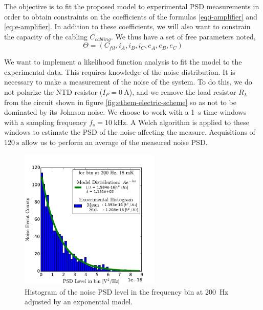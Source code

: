 The objective is to fit the proposed model to experimental PSD measurements in order to obtain constraints on the coefficients of the formulas \ref{eq:i-amplifier} and \ref{eq:e-amplifier}. In addition to these coefficients, we will also want to constrain the capacity of the cabling $C_{cabling}$. We thus have a set of free parameters noted,
\begin{equation}
\Theta=(C_{fil}, i_A, i_B, i_C, e_A, e_B, e_C)
\end{equation}

We want to implement a likelihood function analysis to fit the model to the experimental data. This requires knowledge of the noise distribution. It is necessary to make a measurement of the noise of the system. To do this, we do not polarize the NTD resistor ($I_P=\SI{0}{\ampere}$), and we remove the load resistor $R_L$ from the circuit shown in figure \ref{fig:ethem-electric-scheme} so as not to be dominated by its Johnson noise. We choose to work with a \SI{1}{\s} time windows with a sampling frequency $f_s=\SI{10}{\kilo\Hz}$. A Welch algorithm is applied to these windows to estimate the PSD of the noise affecting the measure. Acquisitions of $\SI{120}{\s}$ allow us to perform an average of the measured noise PSD.

\begin{figure}
\begin{center}
\includegraphics[width=0.6\textwidth]{Figures/Ethem/fit_exp_fin.pdf}
\end{center}
\caption{Histogram of the noise PSD level in the frequency bin at \SI{200}{\Hz} adjusted by an exponential model.}
\label{fig:noise-form}
\end{figure}

